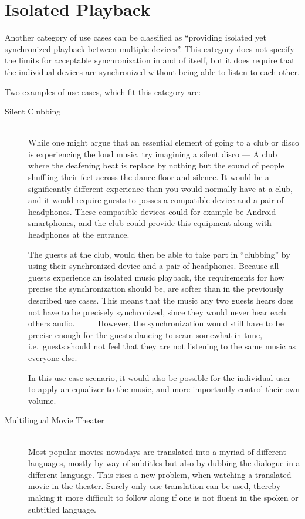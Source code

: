 \section{Isolated Playback}
Another category of use cases can be classified as \enquote{providing isolated yet synchronized playback between multiple devices}.
This category does not specify the limits for acceptable synchronization in and of itself, but it does require that the individual devices are synchronized without being able to listen to each other.

Two examples of use cases, which fit this category are:
\begin{description}
    \item[Silent Clubbing] \hfill\\
        While one might argue that an essential element of going to a club or disco is experiencing the loud music, try imagining a silent disco ---
        A club where the deafening beat is replace by nothing but the sound of people shuffling their feet across the dance floor and silence.
        It would be a significantly different experience than you would normally have at a club, and it would require guests to posses a compatible device and a pair of headphones.
        These compatible devices could for example be Android smartphones, and the club could provide this equipment along with headphones at the entrance.

        The guests at the club, would then be able to take part in \enquote{clubbing} by using their synchronized device and a pair of headphones.
        Because all guests experience an isolated music playback, the requirements for how precise the synchronization should be, are softer than in the previously described use cases.
        This means that the music any two guests hears does not have to be precisely synchronized, since they would never hear each others audio.
        However, the synchronization would still have to be precise enough for the guests dancing to seam somewhat in tune, i.e.~guests should not feel that they are not listening to the same music as everyone else.

        In this use case scenario, it would also be possible for the individual user to apply an equalizer to the music, and more importantly control their own volume.
    \item[Multilingual Movie Theater] \hfill\\
        Most popular movies nowadays are translated into a myriad of different languages, mostly by way of subtitles but also by dubbing the dialogue in a different language.
        This rises a new problem, when watching a translated movie in the theater.
        Surely only one translation can be used, thereby making it more difficult to follow along if one is not fluent in the spoken or subtitled language.


\end{description}

